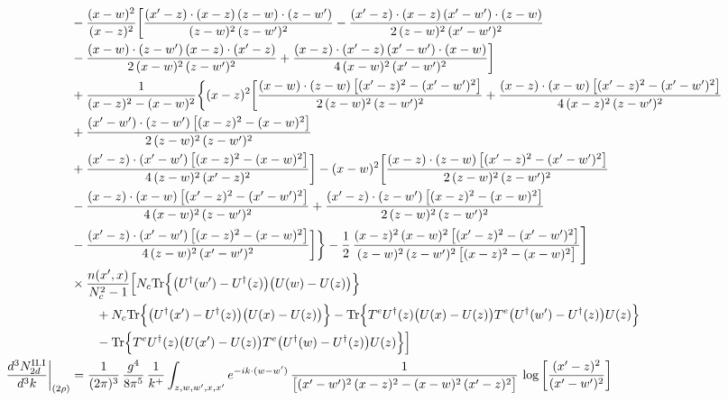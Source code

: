 \documentclass[9pt]{article}
\numberwithin{equation}{section}
\begin{document}
\begin{align}
&-\frac{(x-w)^{2}}{(x-z)^{2}}\bigg[\frac{(x^{\prime}-z)\cdot(x-z)\,(z-w)\cdot(z-w^{\prime})}{(z-w)^{2}\,(z-w^{\prime})^{2}}-\frac{(x^{\prime}-z)\cdot(x-z)\,(x^{\prime}-w^{\prime})\cdot(z-w)}{2\,(z-w)^{2}\,(x^{\prime}-w^{\prime})^{2}}\notag \\ & -\frac{(x-w)\cdot(z-w^{\prime})\,(x-z)\cdot(x^{\prime}-z)}{2\,(x-w)^{2}\,(z-w^{\prime})^{2}}+\frac{(x-z)\cdot(x^{\prime}-z)\,(x^{\prime}-w^{\prime})\cdot(x-w)}{4\,(x-w)^{2}\,(x^{\prime}-w^{\prime})^{2}}\bigg]\notag\\
&+\frac{1}{(x-z)^{2}-(x-w)^{2}}\bigg\{(x-z)^{2}\bigg[\frac{(x-w)\cdot(z-w)\,\big[(x^{\prime}-z)^{2}-(x^{\prime}-w^{\prime})^{2}\big]}{2\,(z-w)^{2}\,(z-w^{\prime})^{2}}+\frac{(x-z)\cdot(x-w)\,\big[(x^{\prime}-z)^{2}-(x^{\prime}-w^{\prime})^{2}\big]}{4\,(x-z)^{2}\,(z-w^{\prime})^{2}}\notag\\ &+\frac{(x^{\prime}-w^{\prime})\cdot(z-w^{\prime})\,\big[(x-z)^{2}-(x-w)^{2}\big]}{2\,(z-w)^{2}\,(z-w^{\prime})^{2}}\notag \\ & +\frac{(x^{\prime}-z)\cdot(x^{\prime}-w^{\prime})\,\big[(x-z)^{2}-(x-w)^{2}\big]}{4\,(z-w)^{2}\,(x^{\prime}-z)^{2}}\bigg]-(x-w)^{2}\bigg[\frac{(x-z)\cdot(z-w)\,\big[(x^{\prime}-z)^{2}-(x^{\prime}-w^{\prime})^{2}\big]}{2\,(z-w)^{2}\,(z-w^{\prime})^{2}}\notag \\ & -\frac{(x-z)\cdot(x-w)\,\big[(x^{\prime}-z)^{2}-(x^{\prime}-w^{\prime})^{2}\big]}{4\,(x-w)^{2}\,(z-w^{\prime})^{2}}+\frac{(x^{\prime}-z)\cdot(z-w^{\prime})\,\big[(x-z)^{2}-(x-w)^{2}\big]}{2\,(z-w)^{2}\,(z-w^{\prime})^{2}}\notag \\ & -\frac{(x^{\prime}-z)\cdot(x^{\prime}-w^{\prime})\,\big[(x-z)^{2}-(x-w)^{2}\big]}{4\,(z-w)^{2}\,(x^{\prime}-w^{\prime})^{2}}\bigg]\bigg\}-\frac{1}{2}\,\frac{(x-z)^{2}\,(x-w)^{2}\,\big[(x^{\prime}-z)^{2}-(x^{\prime}-w^{\prime})^{2}\big]}{(z-w)^{2}\,(z-w^{\prime})^{2}\,\big[(x-z)^{2}-(x-w)^{2}\big]}\Bigg]\notag\\ &\times\frac{n(x',x)}{N_{c}^{2}-1}\Big[N_{c}{\rm Tr}\Big\{\big(U^{\dagger}(w')-U^{\dagger}(z)\big)\big(U(w)-U(z)\big)\Big\}\notag\\&\qquad+N_{c}{\rm Tr}\Big\{\big(U^{\dagger}(x')-U^{\dagger}(z)\big)\big(U(x)-U(z)\big)\Big\}-{\rm Tr}\Big\{T^{e}U^{\dagger}(z)\big(U(x)-U(z)\big)T^{e}\big(U^{\dagger}(w')-U^{\dagger}(z)\big)U(z)\Big\}\notag\\&\qquad-{\rm Tr}\Big\{T^{e}U^{\dagger}(z)\big(U(x')-U(z)\big)T^{e}\big(U^{\dagger}(w)-U^{\dagger}(z)\big)U(z)\Big\}\Big]\\
\frac{d^{3}N^{\rm II.I}_{2d}}{d^{3}k}\bigg|_{(2\rho)}&= \frac{1}{(2\pi)^{3}}\,\frac{g^{4}}{8\pi^{5}}\,\frac{1}{k^{+}}\int_{z,w,w^{\prime},x,x^{\prime}}e^{-ik\cdot(w-w^{\prime})}\,\frac{1}{\big[(x^{\prime}-w^{\prime})^{2}\,(x-z)^{2}-(x-w)^{2}\,(x^{\prime}-z)^{2}\big]}\,\log\left[\frac{(x^{\prime}-z)^{2}}{(x^{\prime}-w^{\prime})^{2}}\right]\notag\\

\end{align}
\end{document}
